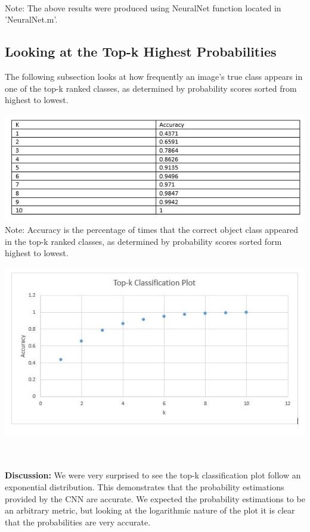 \documentclass[11pt,english]{article}
\begin{document}
    ~\\
    \noindent
    Note: The above results were produced using NeuralNet function located in 'NeuralNet.m'.

\subsection{Looking at the Top-k Highest Probabilities}
	The following subsection looks at how frequently an image's true class appears in one of the top-k ranked classes, as determined by probability scores sorted from highest to lowest.
\begin{center}
	\includegraphics[scale=0.8]{topktable}
	Note: Accuracy is the percentage of times that the correct object class appeared in the top-k ranked classes, as determined by probability scores sorted form highest to lowest. 
	~\\
\end{center}
\begin{center}
	\includegraphics[scale=0.8]{topkplot}
	~\\~\\
\end{center}
\textbf{Discussion:}
      We were very surprised to see the top-k classification plot follow an exponential distribution. This demonstrates that the probability estimations provided by the CNN are accurate. We expected the probability estimations to be an arbitrary metric, but looking at the logarithmic nature of the plot it is clear that the probabilities are very accurate. 
\end{document}
